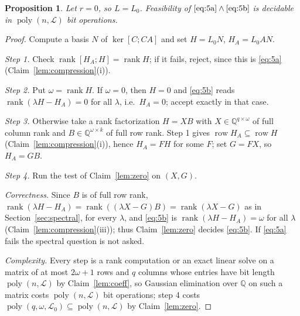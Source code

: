 \documentclass[journal]{IEEEtran}
\theoremstyle{plainn}
\newtheorem{prop}[thm]{Proposition}
\theoremstyle{remark}
\begin{document}
\begin{prop}\label{prop:zero}
Let $r=0$, so $L=L_0$. Feasibility of $\eqref{eq:5a}\wedge\eqref{eq:5b}$ is
decidable in $\operatorname{poly}(n,\mathcal L)$ bit operations.
\end{prop}

\begin{proof}
Compute a basis $N$ of $\ker[C;CA]$ and set $H=L_0N$, $H_A=L_0AN$.

\emph{Step 1.} Check $\operatorname{rank}[H_A;H]=\operatorname{rank}H$; if it
fails, reject, since this is \eqref{eq:5a}
(Claim~\ref{lem:compression}(i)).

\emph{Step 2.} Put $\omega=\operatorname{rank}H$. If $\omega=0$, then $H=0$ and
\eqref{eq:5b} reads $\operatorname{rank}(\lambda H-H_A)=0$ for all $\lambda$,
i.e.\ $H_A=0$; accept exactly in that case.

\emph{Step 3.} Otherwise take a rank factorization $H=XB$ with
$X\in\mathbb Q^{q\times\omega}$ of full column rank and
$B\in\mathbb Q^{\omega\times k}$ of full row rank. Step 1 gives
$\operatorname{row}H_A\subseteq\operatorname{row}H$
(Claim~\ref{lem:compression}(i)), hence $H_A=FH$ for some $F$; set $G=FX$, so
$H_A=GB$.

\emph{Step 4.} Run the test of Claim~\ref{lem:zero} on $(X,G)$.

\emph{Correctness.} Since $B$ is of full row rank,
$\operatorname{rank}(\lambda H-H_A)=\operatorname{rank}((\lambda X-G)B)=\operatorname{rank}(\lambda X-G)$
as in Section~\ref{sec:spectral}, for every $\lambda$, and \eqref{eq:5b} is
$\operatorname{rank}(\lambda H-H_A)=\omega$ for all $\lambda$
(Claim~\ref{lem:compression}(iii)); thus
Claim~\ref{lem:zero} decides \eqref{eq:5b}. If \eqref{eq:5a} fails the spectral
question is not asked.

\emph{Complexity.} Every step is a rank computation or an exact linear solve on a
matrix of at most $2\omega+1$ rows and $q$ columns whose entries have bit length
$\operatorname{poly}(n,\mathcal L)$ by Claim~\ref{lem:coeff}, so Gaussian
elimination over $\mathbb Q$ on such a matrix costs $\operatorname{poly}(n,\mathcal L)$
bit operations; step 4 costs
$\operatorname{poly}(q,\omega,\mathcal L_0)\subseteq\operatorname{poly}(n,\mathcal L)$
by Claim~\ref{lem:zero}.
\end{proof}
\end{document}
